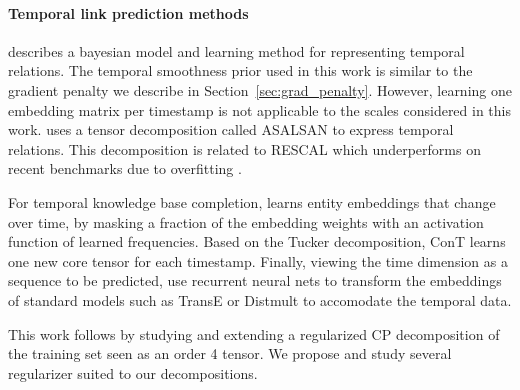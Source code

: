 \documentclass{article}
\begin{document}
\paragraph{Temporal link prediction methods}
\citet{sarkar2006dynamic} describes a bayesian model and learning method for representing temporal relations. The temporal smoothness prior used in this work is similar to the gradient penalty we describe in Section~\ref{sec:grad_penalty}. However, learning one embedding matrix per timestamp is not applicable to the scales considered in this work. \citet{bader2007temporal} uses a tensor decomposition called ASALSAN to express temporal relations. This decomposition is related to RESCAL \citep{nickel_three-way_2011} which underperforms on recent benchmarks due to overfitting \citep{nickel_holographic_2015}.

For temporal knowledge base completion, \citet{goel2019diachronic} learns entity embeddings that change over time, by masking a fraction of the embedding weights with an activation function of learned frequencies. Based on the Tucker decomposition, ConT \citep{ma2018embedding} learns one new core tensor for each timestamp. Finally, viewing the time dimension as a sequence to be predicted, \citet{garcia2018learning} use recurrent neural nets to transform the embeddings of standard models such as TransE or Distmult to accomodate the temporal data. 

This work follows \citet{lacroix2018canonical} by studying and extending a regularized CP decomposition of the training set seen as an order 4 tensor. We propose and study several regularizer suited to our decompositions.
\end{document}
